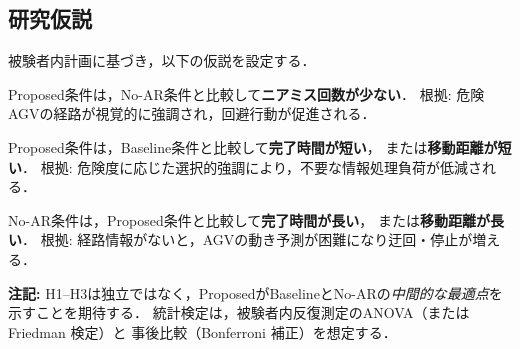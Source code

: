 \subsection{研究仮説}

被験者内計画に基づき，以下の仮説を設定する．

\begin{description}[leftmargin=0em,style=nextline]
  \item[\textbf{H1（安全性）}]
    Proposed条件は，No-AR条件と比較して\textbf{ニアミス回数が少ない}．
    根拠: 危険AGVの経路が視覚的に強調され，回避行動が促進される．

  \item[\textbf{H2（効率）}]
    Proposed条件は，Baseline条件と比較して\textbf{完了時間が短い}，
    または\textbf{移動距離が短い}．
    根拠: 危険度に応じた選択的強調により，不要な情報処理負荷が低減される．

  \item[\textbf{H3（情報なし対照）}]
    No-AR条件は，Proposed条件と比較して\textbf{完了時間が長い}，
    または\textbf{移動距離が長い}．
    根拠: 経路情報がないと，AGVの動き予測が困難になり迂回・停止が増える．
\end{description}

\noindent
\textbf{注記:}
H1--H3は独立ではなく，ProposedがBaselineとNo-ARの\emph{中間的な最適点}を
示すことを期待する．
統計検定は，被験者内反復測定のANOVA（または Friedman 検定）と
事後比較（Bonferroni 補正）を想定する．
